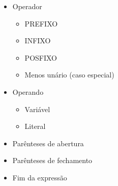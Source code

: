 \documentclass[a4paper,12pt,openany]{book}
\begin{document}
\begin{itemize}
	\item Operador
	\begin{itemize}
		\item PREFIXO
		\item INFIXO
		\item POSFIXO
		\item Menos unário (caso especial)
	\end{itemize}
	\item Operando
	\begin{itemize}
		\item Variável
		\item Literal
	\end{itemize}
	\item Parênteses de abertura 
	\item Parênteses de fechamento
	\item Fim da expressão
\end{itemize}
\end{document}
